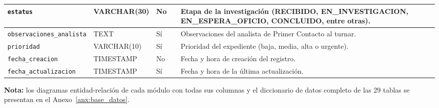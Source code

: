 \begin{longtable}{|L{3.9cm}|L{2.4cm}|L{0.9cm}|L{1.2cm}|L{6.6cm}|}
		\texttt{estatus} & VARCHAR(30) & No &  & Etapa de la investigación (RECIBIDO, EN\_INVESTIGACION, EN\_ESPERA\_OFICIO, CONCLUIDO, entre otras). \\ \hline
		\texttt{observaciones\_\allowbreak{}analista} & TEXT & Sí &  & Observaciones del analista de Primer Contacto al turnar. \\ \hline
		\texttt{prioridad} & VARCHAR(10) & Sí &  & Prioridad del expediente (baja, media, alta o urgente). \\ \hline
		\texttt{fecha\_\allowbreak{}creacion} & TIMESTAMP & No &  & Fecha y hora de creación del registro. \\ \hline
		\texttt{fecha\_\allowbreak{}actualizacion} & TIMESTAMP & Sí &  & Fecha y hora de la última actualización. \\ \hline
\end{longtable}
\normalsize
\setlength{\tabcolsep}{6pt}
\renewcommand{\arraystretch}{1}

\noindent\textbf{Nota:} los diagramas entidad-relación de cada módulo con todas sus columnas y el diccionario de datos completo de las 29 tablas se presentan en el Anexo~\ref{anx:base_datos}.
